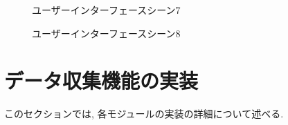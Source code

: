 \begin{figure}[htbp]
    \begin{center}
    \end{center}
    \caption{ユーザーインターフェースシーン7}
    \label{fig:seen7}
\end{figure}

\begin{figure}[htbp]
    \begin{center}
    \end{center}
    \caption{ユーザーインターフェースシーン8}
    \label{fig:seen8}
\end{figure}


\section{データ収集機能の実装}
このセクションでは, 各モジュールの実装の詳細について述べる.

